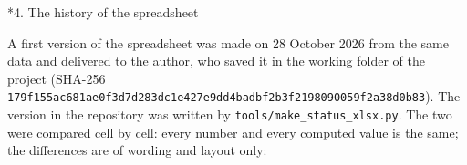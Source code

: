 \documentclass[10pt,a4paper]{article}
\makeatletter
\renewcommand\section{\@startsection{section}{1}{\z@}{-3.5ex \@plus -1ex \@minus -.2ex}{2.3ex \@plus.2ex}{\normalfont\Large\bfseries\raggedright}}
\makeatother
\begin{document}
\section*{4. The history of the spreadsheet}
A first version of the spreadsheet was made on 28 October 2026 from the same data and delivered to the author, who saved it in the working folder of the project (SHA-256 \texttt{179f155a\allowbreak{}c681ae0f\allowbreak{}3d7d283d\allowbreak{}c1e427e9\allowbreak{}dd4badbf\allowbreak{}2b3f2198\allowbreak{}090059f2\allowbreak{}a38d0b83}). The version in the repository was written by \texttt{tools/\allowbreak{}make\_\allowbreak{}status\_\allowbreak{}xlsx.py}. The two were compared cell by cell: every number and every computed value is the same; the differences are of wording and layout only:
\end{document}

